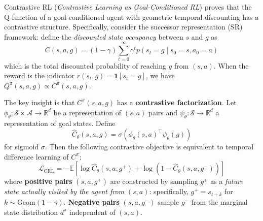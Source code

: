 \documentclass[11pt, letterpaper]{article}
\begin{document}
\begin{concept}
    Contrastive RL (\textit{Contrastive Learning as Goal-Conditioned RL}) proves that the Q-function of a goal-conditioned agent with geometric temporal discounting has a contrastive structure. Specifically, consider the successor representation (SR) framework: define the \textit{discounted state occupancy} between \(s\) and \(g\) as
    \[
        C(s, a, g) = (1 - \gamma)\sum_{t=0}^\infty \gamma^t p(s_t = g \mid s_0 = s, a_0 = a)
    \]
    which is the total discounted probability of reaching \(g\) from \((s, a)\). When the reward is the indicator \(r(s_t, g) = \mathbf{1}[s_t = g]\), we have \(Q^\pi(s, a, g) \propto C^\pi(s, a, g)\).
 
    The key insight is that \(C^\pi(s, a, g)\) has a \textbf{contrastive factorization}. Let \(\phi_\theta : \mathcal{S} \times \mathcal{A} \to \mathbb{R}^d\) be a representation of \((s, a)\) pairs and \(\psi_\theta : \mathcal{S} \to \mathbb{R}^d\) a representation of goal states. Define
    \[
        \hat{C}_\theta(s, a, g) = \sigma\!\left(\phi_\theta(s, a)^\top \psi_\theta(g)\right)
    \]
    for sigmoid \(\sigma\). Then the following contrastive objective is equivalent to temporal difference learning of \(C^\pi\):
    \[
        \mathcal{L}_{\text{CRL}} = -\mathbb{E}\left[\log \hat{C}_\theta(s, a, g^+) + \log(1 - \hat{C}_\theta(s, a, g^-))\right]
    \]
    where \textbf{positive pairs} \((s, a, g^+)\) are constructed by sampling \(g^+\) as a \textit{future state actually visited by the agent from} \((s, a)\): specifically, \(g^+ = s_{t+k}\) for \(k \sim \text{Geom}(1 - \gamma)\). \textbf{Negative pairs} \((s, a, g^-)\) sample \(g^-\) from the marginal state distribution \(d^\pi\) independent of \((s, a)\).
\end{concept}
 
\end{document}
